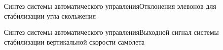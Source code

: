 \begin{frame}{Синтез системы автоматического управления}{Отклонения элевонов для стабилизации угла скольжения}
\end{frame}

\begin{frame}{Синтез системы автоматического управления}{Выходной сигнал системы стабилизации вертикальной скорости самолета}
\end{frame}